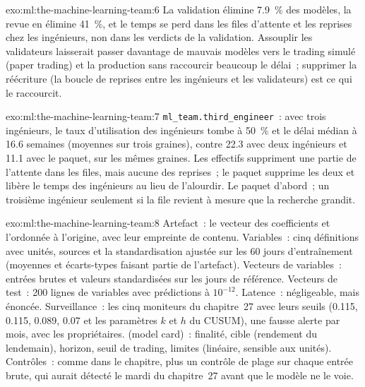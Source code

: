 \begin{solution}{exo:ml:the-machine-learning-team:6}
La validation élimine 7.9~\% des modèles, la revue en élimine 41~\%, et le temps se perd dans les files d'attente et les reprises chez les ingénieurs, non dans les
verdicts de la validation. Assouplir les validateurs laisserait passer davantage de mauvais modèles vers le trading simulé (paper trading) et la production sans raccourcir beaucoup le
délai~; supprimer la réécriture (la boucle de reprises entre les ingénieurs et les validateurs) est ce qui le raccourcit.
\end{solution}

\begin{solution}{exo:ml:the-machine-learning-team:7}
\texttt{ml\_team.third\_engineer}~: avec trois ingénieurs, le taux d'utilisation des ingénieurs tombe à 50~\% et le délai médian à 16.6
semaines (moyennes sur trois graines), contre 22.3 avec deux ingénieurs et 11.1 avec le paquet, sur les mêmes graines. Les effectifs suppriment
une partie de l'attente dans les files, mais aucune des reprises~; le paquet supprime les deux et libère le temps des ingénieurs au lieu de l'alourdir. Le
paquet d'abord~; un troisième ingénieur seulement si la file revient à mesure que la recherche grandit.
\end{solution}

\begin{solution}{exo:ml:the-machine-learning-team:8}
Artefact~: le vecteur des coefficients et l'ordonnée à l'origine, avec leur empreinte de contenu. Variables~: cinq définitions avec unités, sources et la
standardisation ajustée sur les 60 jours d'entraînement (moyennes et écarts-types faisant partie de l'artefact). Vecteurs de variables~: entrées
brutes et valeurs standardisées sur les jours de référence. Vecteurs de test~: 200 lignes de variables avec prédictions à $10^{-12}$. Latence~: négligeable,
mais énoncée. Surveillance~: les cinq moniteurs du chapitre~27 avec leurs seuils (0.115, 0.115, 0.089, 0.07 et les paramètres $k$ et
$h$ du CUSUM), une fausse alerte par mois, avec les propriétaires.  (model card)~: finalité, cible (rendement du lendemain), horizon, seuil de trading, limites
(linéaire, sensible aux unités). Contrôles~: comme dans le chapitre, plus un contrôle de plage sur chaque entrée brute, qui aurait détecté le
mardi du chapitre~27 avant que le modèle ne le voie.
\end{solution}

